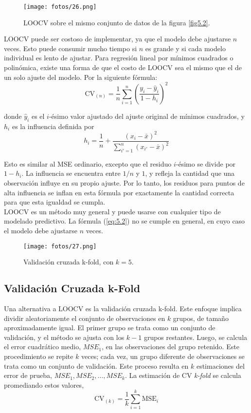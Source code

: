 \begin{figure}[h]
\centering
\texttt{[image: fotos/26.png]}
\caption{LOOCV sobre el mismo conjunto de datos de la figura \ref{fig5.2}.}
\label{fig5.4}
\end{figure}

LOOCV puede ser costoso de implementar, ya que el modelo debe ajustarse $n$ veces. Esto puede consumir mucho tiempo si $n$ es grande y si cada modelo individual es lento de ajustar. Para regresión lineal por mínimos cuadrados o polinómica, existe una forma de que el costo de LOOCV sea el mismo que el de un solo ajuste del modelo. Por la siguiente fórmula:
\begin{equation}
\text{CV}_{(n)} = \frac{1}{n} \sum_{i=1}^{n} \left(\frac{y_i - \hat{y}_i}{1 - h_i}\right)^2
\label{eq:5.2}
\end{equation}

donde $\hat{y}_i$ es el $i$-ésimo valor ajustado del ajuste original de mínimos cuadrados, y $h_i$ es la influencia definida por
\begin{equation}
h_i = \frac{1}{n} + \frac{(x_i - \bar{x})^2}{\sum_{i'=1}^n (x_{i'} - \bar{x})^2}
\end{equation}

Esto es similar al MSE ordinario, excepto que el residuo $i$-ésimo se divide por $1 - h_i$. La influencia se encuentra entre $1/n$ y $1$, y refleja la cantidad que una observación influye en su propio ajuste. Por lo tanto, los residuos para puntos de alta influencia se inflan en esta fórmula por exactamente la cantidad correcta para que esta igualdad se cumpla. \\

LOOCV es un método muy general y puede usarse con cualquier tipo de modelado predictivo. La fórmula (\ref{eq:5.2}) no se cumple en general, en cuyo caso el modelo debe ajustarse $n$ veces.

\begin{figure}[h]
\centering
\texttt{[image: fotos/27.png]}
\caption{Validación cruzada k-fold, con $k = 5$.}
\label{fig:5.5}
\end{figure}

\subsection{Validación Cruzada k-Fold}

Una alternativa a LOOCV es la validación cruzada k-fold. Este enfoque implica dividir aleatoriamente el conjunto de observaciones en $k$ grupos, de tamaño aproximadamente igual. El primer grupo se trata como un conjunto de validación, y el método se ajusta con los $k-1$ grupos restantes. Luego, se calcula el error cuadrático medio, $MSE_1$, en las observaciones del grupo retenido. Este procedimiento se repite $k$ veces; cada vez, un grupo diferente de observaciones se trata como un conjunto de validación. Este proceso resulta en $k$ estimaciones del error de prueba, $MSE_1, MSE_2, \dots, MSE_k$. La estimación de CV \textit{k-fold} se calcula promediando estos valores,
\begin{equation}
\text{CV}_{(k)} = \frac{1}{k} \sum_{i=1}^{k} \text{MSE}_i
\end{equation}

